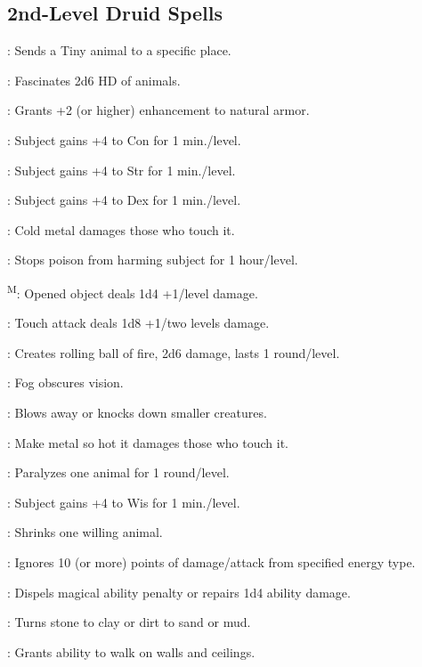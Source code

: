 \subsection{2nd-Level Druid Spells}

: Sends a Tiny animal to a specific place.

: Fascinates 2d6 HD of animals.

: Grants +2 (or higher) enhancement to natural armor.

: Subject gains +4 to Con for 1 min./level.

: Subject gains +4 to Str for 1 min./level.

: Subject gains +4 to Dex for 1 min./level.

: Cold metal damages those who touch it.

: Stops poison from harming subject for 1 hour/level.

\textsuperscript{M}: Opened object deals 1d4 +1/level damage.

: Touch attack deals 1d8 +1/two levels damage.

: Creates rolling ball of fire, 2d6 damage, lasts 1 round/level.

: Fog obscures vision.

: Blows away or knocks down smaller creatures.

: Make metal so hot it damages those who touch it.

: Paralyzes one animal for 1 round/level.

: Subject gains +4 to Wis for 1 min./level.

: Shrinks one willing animal.

: Ignores 10 (or more) points of damage/attack from specified energy type.

: Dispels magical ability penalty or repairs 1d4 ability damage.

: Turns stone to clay or dirt to sand or mud.

: Grants ability to walk on walls and ceilings.

